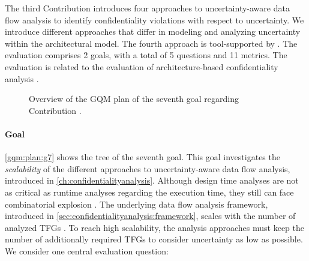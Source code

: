 The third Contribution  introduces four approaches to uncertainty-aware data flow analysis to identify confidentiality violations with respect to uncertainty.
We introduce different approaches that differ in modeling and analyzing uncertainty within the architectural model.
The fourth approach is tool-supported by \abunai.
The evaluation comprises 2 goals, with a total of 5 questions and 11 metrics.
The evaluation is related to the evaluation of architecture-based confidentiality analysis \cite{walter_context-based_2023,seifermann_architectural_2022}.

\newcommand{\textGvii}[0]{Validate the \emph{scalability} of the uncertainty-aware data flow analyses that correlate with the number of considered \acsp{TFG} in the analysis.}
\newcommand{\textGviiQi}[0]{How does the \emph{scalability} of the uncertainty-aware analyses compare?}
\newcommand{\textGviiQiMi}[0]{Scalability of scenario-aware analysis, $\emph{scalability\textsubscript{scenario}}=\frac{N_{S}}{\abs{U}}$}
\newcommand{\textGviiQiMii}[0]{Scalability of graph-aware analysis, $\emph{scalability\textsubscript{graph}}=\frac{N_{G}}{\abs{U}}$}
\newcommand{\textGviiQiMiii}[0]{Scalability of impact-aware analysis, $\emph{scalability\textsubscript{impact}}=\frac{N_{I}}{\abs{U}}$}
\begin{figure}
    \centering
    \caption{Overview of the \ac*{GQM} plan of the seventh goal regarding Contribution .}
    \label{gqm:plan:g7}
\end{figure}

\paragraph{Goal }\label{gqm:text:g:7}
\autoref{gqm:plan:g7} shows the tree of the seventh goal.
This goal investigates the \emph{scalability} of the different approaches to uncertainty-aware data flow analysis, introduced in \autoref{ch:confidentialityanalysis}.
Although design time analyses are not as critical as runtime analyses regarding the execution time, they still can face combinatorial explosion \cite{koziolek_automated_2011}.
The underlying data flow analysis framework, introduced in \autoref{sec:confidentialityanalysis:framework}, scales with the number of analyzed \acfp{TFG} \cite{schwickerath_tool-supported_2023}.
To reach high scalability, the analysis approaches must keep the number of additionally required \acp{TFG} to consider uncertainty as low as possible.
We consider one central evaluation question:

